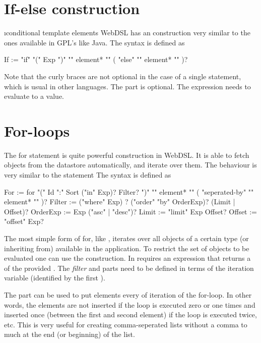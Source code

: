 \section{If-else construction}\i{conditional template elements}
WebDSL has an  construction very similar to the ones available in GPL's like Java. The syntax is defined as
\begin{shell}
If	:= "if" "(" Exp ")" "{" element* "}" ( "else" "{" element* "}" )?
\end{shell}
Note that the curly braces are not optional in the case of a single statement, which is usual in other languages. The  part is optional. The expression needs to evaluate to a  value. 

\section{For-loops}
The for statement is quite powerful construction in WebDSL. It is able to fetch objects from the datastore automatically, and iterate over them. The behaviour is very similar to the  statement The syntax is defined as 
\begin{shell}
For       := for "(" Id ":" Sort ("in" Exp)? Filter? ")" "{" element* "}" ( "seperated-by" "{" element* "}" )?
Filter 		:= ("where" Exp) ? ("order" "by" OrderExp)? (Limit | Offset)?
OrderExp 	:= Exp ("asc" | "desc")?
Limit			:= "limit" Exp Offset?
Offset		:= "offset" Exp?
\end{shell}
The most simple form of for, like , iterates over all objects of a certain type (or inheriting from) available in the application. To restrict the set of objects to be evaluated one can use the  construction. In requires an expression that returns a  of the provided . The \emph{filter} and  parts need to be defined in terms of the iteration variable (identified by the first ). 

The  part can be used to put elements  every of iteration of the for-loop. In other words, the elements are not inserted if the loop is executed zero or one times and inserted once (between the first and second element) if the loop is executed twice, etc. This is very useful for creating comma-seperated lists without a comma to much at the end (or beginning) of the list. 

